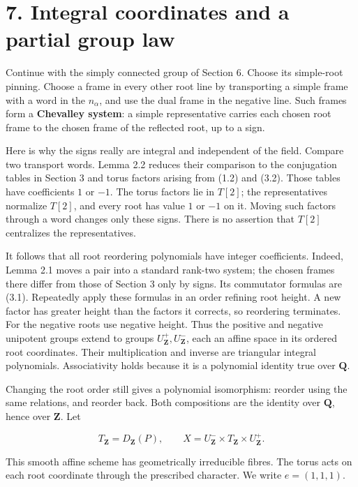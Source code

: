 \documentclass[11pt,a4paper,openany]{report}
\begin{document}
\section{7. Integral coordinates and a partial group law}\label{AG-RG-05-integral-coordinates-and-a-partial-group-law}

Continue with the simply connected group of Section 6. Choose its simple-root pinning. Choose a frame in every other root line by transporting a simple frame with a word in the \(n_\alpha\), and use the dual frame in the negative line. Such frames form a \textbf{Chevalley system}: a simple representative carries each chosen root frame to the chosen frame of the reflected root, up to a sign.

Here is why the signs really are integral and independent of the field. Compare two transport words. Lemma 2.2 reduces their comparison to the conjugation tables in Section 3 and torus factors arising from (1.2) and (3.2). Those tables have coefficients \(1\) or \(-1\). The torus factors lie in \(T[2]\); the representatives normalize \(T[2]\), and every root has value \(1\) or \(-1\) on it. Moving such factors through a word changes only these signs. There is no assertion that \(T[2]\) centralizes the representatives.

It follows that all root reordering polynomials have integer coefficients. Indeed, Lemma 2.1 moves a pair into a standard rank-two system; the chosen frames there differ from those of Section 3 only by signs. Its commutator formulas are (3.1). Repeatedly apply these formulas in an order refining root height. A new factor has greater height than the factors it corrects, so reordering terminates. For the negative roots use negative height. Thus the positive and negative unipotent groups extend to groups \(U^+_{\mathbf Z},U^-_{\mathbf Z}\), each an affine space in its ordered root coordinates. Their multiplication and inverse are triangular integral polynomials. Associativity holds because it is a polynomial identity true over \(\mathbf Q\).

Changing the root order still gives a polynomial isomorphism: reorder using the same relations, and reorder back. Both compositions are the identity over \(\mathbf Q\), hence over \(\mathbf Z\). Let

\[
T_{\mathbf Z}=D_{\mathbf Z}(P),\qquad
X=U^-_{\mathbf Z}\times T_{\mathbf Z}\times U^+_{\mathbf Z}.
\tag{7.1}
\]

This smooth affine scheme has geometrically irreducible fibres. The torus acts on each root coordinate through the prescribed character. We write \(e=(1,1,1)\).
\end{document}
